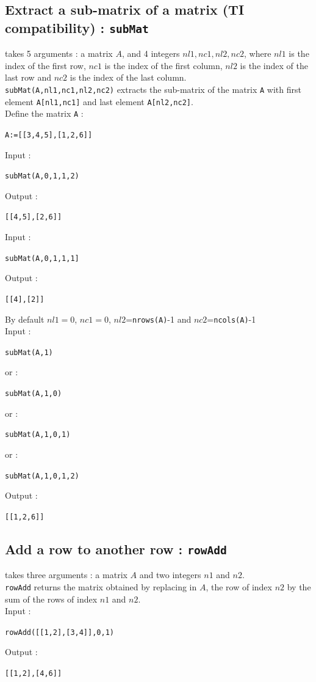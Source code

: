 \documentclass[a4paper,11pt]{book}
\begin{document}
\subsection{Extract a sub-matrix of a matrix (TI compatibility) : {\tt subMat}}
 takes 5 arguments : a matrix $A$, and 4 integers 
$nl1,nc1,nl2,nc2$, where
$nl1$ is the index of the first row, $nc1$ is
the index of the first column, $nl2$ is the index of
the last row and  $nc2$ is the index of the last column.\\    
{\tt subMat(A,nl1,nc1,nl2,nc2)} extracts the sub-matrix of the matrix {\tt A}
with first element {\tt A[nl1,nc1]} and last element 
{\tt A[nl2,nc2]}.\\
Define the matrix {\tt A} :
\begin{center}{\tt A:=[[3,4,5],[1,2,6]]}\end{center}
Input :
\begin{center}{\tt subMat(A,0,1,1,2)}\end{center}
Output :
\begin{center}{\tt [[4,5],[2,6]]}\end{center}
Input :
\begin{center}{\tt subMat(A,0,1,1,1]}\end{center}
Output :
\begin{center}{\tt [[4],[2]]}\end{center}
By default $nl1=0$, $nc1=0$, $nl2$={\tt nrows(A)}-1 and 
$nc2$={\tt ncols(A)}-1\\
Input :
\begin{center}{\tt  subMat(A,1)}\end{center}
or :
\begin{center}{\tt  subMat(A,1,0)}\end{center}
or :
\begin{center}{\tt  subMat(A,1,0,1)}\end{center}
or :
\begin{center}{\tt  subMat(A,1,0,1,2)}\end{center}
Output :
\begin{center}{\tt [[1,2,6]]}\end{center}

\subsection{Add a row to another row : {\tt rowAdd}}
 takes three arguments : a matrix $A$ and two integers 
$n1$ and $n2$.\\
{\tt rowAdd} returns the matrix obtained by replacing in $A$, the row of index
$n2$ by the sum of the rows of index $n1$ and $n2$.\\
Input :
\begin{center}{\tt rowAdd([[1,2],[3,4]],0,1)}\end{center}
Output :
\begin{center}{\tt  [[1,2],[4,6]]}\end{center}
\end{document}
